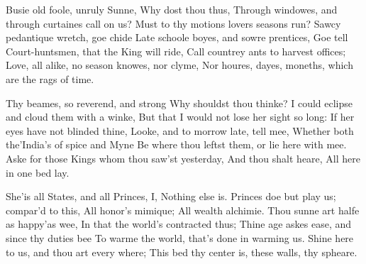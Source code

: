 \documentclass{book}
\newenvironment{poem}[1]%
  {\poemtitle{#1}%
   \Versus
   \numerus{1}%
  }
  {\endVersus}
\begin{document}
\begin{poem}{The Sunne Rising}   %
\Forma {}
      
          Busie old foole, unruly Sunne,   \NotFirstLine     
          Why dost thou thus,        
  Through windowes, and through curtaines call on us? \auto       
  Must to thy motions lovers seasons run?          
          Sawcy pedantique wretch, goe chide       
          Late schoole boyes, and sowre prentices,        
    Goe tell Court-huntsmen, that the King will ride,        
    Call countrey ants to harvest offices;        
  Love, all alike, no season knowes, nor clyme,        
  Nor houres, dayes, moneths, which are the rags of time.       
       
          Thy beames, so reverend, and strong        
          Why shouldst thou thinke?        
  I could eclipse and cloud them with a winke,        
  But that I would not lose her sight so long:        
          If her eyes have not blinded thine,       
          Looke, and to morrow late, tell mee,        
    Whether both the'India's of spice and Myne        
    Be where thou leftst them, or lie here with mee.        
  Aske for those Kings whom thou saw'st yesterday,        
  And thou shalt heare, All here in one bed lay.       

          She'is all States, and all Princes, I,        
          Nothing else is.        
  Princes doe but play us; compar'd to this,        
  All honor's mimique; All wealth alchimie.        
          Thou sunne art halfe as happy'as wee,       
          In that the world's contracted thus;        
    Thine age askes ease, and since thy duties bee        
    To warme the world, that's done in warming us.        
  Shine here to us, and thou art every where;        
  This bed thy center is, these walls, thy spheare.       
\end{poem}
    
\end{document}

